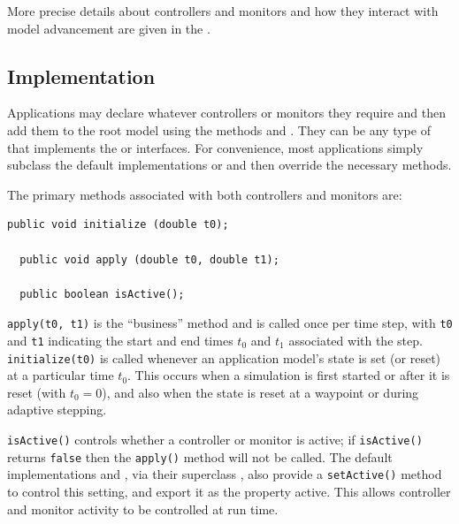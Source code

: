 More precise details about controllers and monitors and how they
interact with model advancement are given in the
.

\subsection{Implementation}
\label{ControllerImplementation:sec}

Applications may declare whatever controllers or monitors they require
and then add them to the root model using the methods
 and
.
They can be any type of
 that implements
the  or
 interfaces.  For
convenience, most applications simply subclass
the default implementations
 or
 and then override
the necessary methods.

The primary methods associated with both controllers and
monitors are:
%
\begin{lstlisting}[]
  public void initialize (double t0);

  public void apply (double t0, double t1);

  public boolean isActive();
\end{lstlisting}
%
{\tt apply(t0, t1)} is the ``business'' method and is called once per
time step, with {\tt t0} and {\tt t1} indicating the start and end
times $t_0$ and $t_1$ associated with the step.  {\tt initialize(t0)}
is called whenever an application model's state is set (or reset) at a
particular time $t_0$. This occurs when a simulation is first started
or after it is reset (with $t_0 = 0$), and also when the state is
reset at a waypoint or during adaptive stepping.

{\tt isActive()} controls whether a controller or monitor is active;
if {\tt isActive()} returns {\tt false} then the {\tt apply()} method
will not be called.
The default implementations
 and
, via their
superclass , also
provide a {\tt setActive()} method to control this setting, and export
it as the property {\sf active}. This allows controller and monitor
activity to be controlled at run time.

